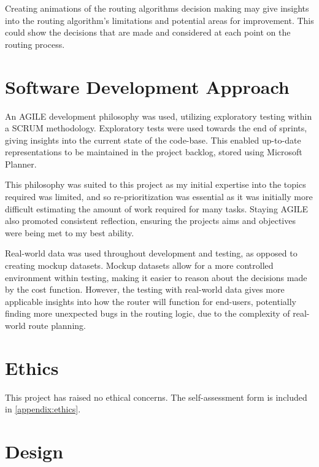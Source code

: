 \documentclass[12pt]{article}
\begin{document}
Creating animations of the routing algorithms decision making may give insights into the routing algorithm's limitations and potential areas for improvement. This could show the decisions that are made and considered at each point on the routing process.

\section{Software Development Approach}

An AGILE development philosophy was used, utilizing exploratory testing within a SCRUM methodology. Exploratory tests were used towards the end of sprints, giving insights into the current state of the code-base. This enabled up-to-date representations to be maintained in the project backlog, stored using Microsoft Planner.

This philosophy was suited to this project as my initial expertise into the topics required was limited, and so re-prioritization was essential as it was initially more difficult estimating the amount of work required for many tasks. Staying AGILE also promoted consistent reflection, ensuring the projects aims and objectives were being met to my best ability.

Real-world data was used throughout development and testing, as opposed to creating mockup datasets. Mockup datasets allow for a more controlled environment within testing, making it easier to reason about the decisions made by the cost function. However, the testing with real-world data gives more applicable insights into how the router will function for end-users, potentially finding more unexpected bugs in the routing logic, due to the complexity of real-world route planning.

\section{Ethics}

This project has raised no ethical concerns. The self-assessment form is included in \autoref{appendix:ethics}.

\section{Design}

\end{document}
